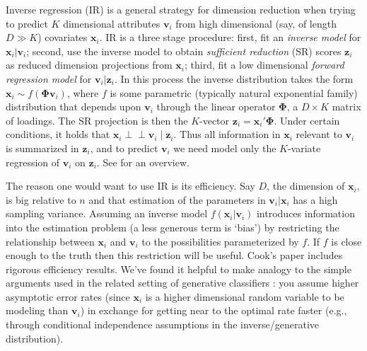 \documentclass[12pt]{article}
\newcommand{\bs}[1]{\boldsymbol{#1}}
\newcommand{\bm}[1]{\mathbf{#1}}
\newcommand{\indep}{\perp\!\!\!\perp}
\begin{document}
Inverse regression (IR) is a general strategy for dimension reduction when
trying to predict $K$ dimensional attributes $\bm{v}_i$ from high dimensional
(say, of length $D \gg K$) covariates $\bm{x}_i$.  IR is a three stage
procedure: first, fit an {\it inverse model} for $\bm{x}_i | \bm{v}_i$;
second, use the inverse model to obtain {\it sufficient reduction} (SR) scores
$\bm{z}_i$ as reduced dimension projections from $\bm{x}_i$; third, fit a low
dimensional {\it forward regression model} for $\bm{v}_i | \bm{z}_i$.   In
this process the inverse distribution takes the form $\bm{x}_i \sim
f(\bs{\Phi}\bm{v}_i)$, where $f$ is some parametric (typically natural
exponential family) distribution that depends upon $\bm{v}_i$ through the
linear operator $\bs{\Phi}$, a $D\times K$ matrix of loadings.  The SR
projection is then the $K$-vector $\bm{z}_i = \bm{x}_i'\bs{\Phi}$. Under
certain conditions, it  holds that $\bm{x}_i \indep \bm{v}_i \mid \bm{z}_i$.
Thus all information in $\bm{x}_i$ relevant to $\bm{v}_i$ is summarized in
$\bm{z}_i$, and to predict $\bm{v}_i$ we need model only the $K$-variate
regression of $\bm{v}_i$ on $\bm{z}_i$. See \citet{cook_fisher_2007} for an
overview.

The reason one would want to use IR is its efficiency.  Say $D$, the dimension
of $\bm{x}_i$, is big relative to $n$ and that estimation of the parameters in
$\bm{v}_i |\bm{x}_i$ has a high sampling variance.  Assuming an inverse model
$f(\bm{x}_i | \bm{v}_i)$ introduces information into the estimation problem (a
less generous term is `bias') by restricting the relationship between
$\bm{x}_i$ and $\bm{v}_i$ to the possibilities parameterized by $f$.  If $f$
is close enough to the truth then this restriction will be useful.  Cook's
paper includes rigorous efficiency results.  We've found it helpful to make
analogy to the simple arguments used in the related setting of generative
classifiers \citep[e.g., as in][for Gaussian
discrimination]{efron_efficiency_1975}: you  assume higher asymptotic error
rates (since $\bm{x}_i$ is a higher dimensional random variable to be modeling
than $\bm{v}_i$) in exchange for getting near to the optimal rate faster
(e.g., through conditional independence assumptions in the inverse/generative
distribution).
\end{document}
